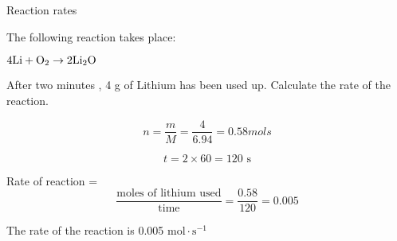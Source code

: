 \begin{wex}{Reaction rates}{The following reaction takes place: 
\begin{center}
$\rm{4Li + O_{2} \rightarrow 2Li_{2}O}$
\end{center}

After two minutes , 4 g of Lithium has been used up. Calculate the rate of the reaction.\\
}

{

\begin{equation*}
n = \frac{m}{M} = \frac{4}{6.94} = 0.58 mols 
\end{equation*}

\begin{equation*}
t = 2 \times 60 = 120 \text{ s}
\end{equation*}

Rate of reaction = \begin{equation*} \frac{\text{moles of lithium  used}}{\text{time}} = \frac{0.58}{120} = 0.005\end{equation*} 

The rate of the reaction is 0.005 $\text{mol} \cdot \text{s}^{-1}$
}\end{wex}

